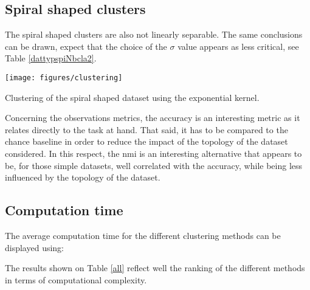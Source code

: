 \documentclass[12pt,a4paper,fleqn]{tufte-handout}
\begin{document}
\subsection{Spiral shaped clusters}

The spiral shaped clusters are also not linearly separable. The same conclusions can be drawn, expect that the choice of the $\sigma$ value appears as less critical, see Table \ref{dattypspiNbcla2}.


\begin{marginfigure}
\texttt{[image: figures/clustering]}
\caption{Clustering of the spiral shaped dataset using the exponential kernel.}
\label{clustering}
\end{marginfigure}

Concerning the observations metrics, the accuracy is an interesting metric as it relates directly to the task at hand. That said, it has to be compared to the chance baseline in order to reduce the impact of the topology of the dataset considered. In this respect, the nmi is an interesting alternative that appears to be, for those simple datasets, well correlated with the accuracy, while being less influenced by the topology of the dataset.

\subsection{Computation time}

The average computation time for the different clustering methods can be displayed using:

The results shown on Table \ref{all} reflect well the ranking of the different methods in terms of computational complexity.


  
  
 
 
  
\end{document}
